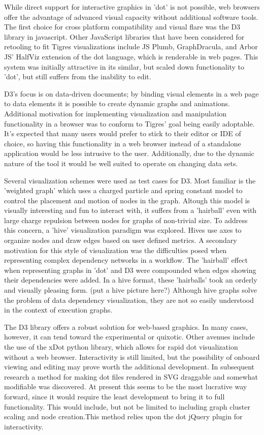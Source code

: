 While direct support for interactive graphics in 'dot' is not possible, web browsers offer the advantage of advanced visual capacity without additional software tools. The first choice for cross platform compatibility and visual flare was the D3\cite{d3} library in javascript. Other JavaScript libraries that have been considered for retooling to fit Tigres visualizations include JS Plumb\cite{jsPlumb}, GraphDracula\cite{graphDracula}, and Arbor JS' HalfViz\cite{halfViz} extension of the dot language, which is renderable in web pages. This system was initially attractive in its similar, but scaled down functionality to 'dot', but still suffers from the inability to edit. 

D3's focus is on data-driven documents; by binding visual elements in a web page to data elements it is possible to create dynamic graphs and animations. Additional motivation for implementing visualization and manipulation functionality in a browser was to conform to Tigres' goal being easily adoptable. It's expected that many users would prefer to stick to their editor or IDE of choice, so having this functionality in a web browser instead of a standalone application would be less intrusive to the user. Additionally, due to the dynamic nature of the tool it would be well suited to operate on changing data sets.

Several visualization schemes were used as test cases for D3. Most familiar is the 'weighted graph' which uses a charged particle and spring constant model to control the placement and motion of nodes in the graph. Altough this model is visually interesting and fun to interact with, it suffers from a 'hairball' even with large charge repulsion between nodes for graphs of non-trivial size. To address this concern, a 'hive' visualization paradigm was explored. Hives use axes to organize nodes and draw edges based on user defined metrics. A secondary motivation for this style of visualization was the difficulties posed when representing complex dependency networks in a workflow. The 'hairball' effect when representing graphs in 'dot' and D3 were compounded when edges showing their dependencies were added. In a hive format, these 'hairballs' took an orderly and visually pleasing form. (put a hive picture here?)
Although hive graphs solve the problem of data dependency visualization, they are not so easily understood in the context of execution graphs. 


 The D3 library offers a robust solution for web-based graphics. In many cases, however, it can tend toward the experimental or quixotic. Other avenues include the use of the xDot\cite{xDot} python library, which allows for rapid dot visualization without a web browser. Interactivity is still limited, but the possibility of onboard viewing and editing may prove worth the additional development. In subsequent research a method for making dot files rendered in SVG draggable and somewhat modifiable was discovered. At present this seems to be the most lucrative way forward, since it would require the least development to bring it to full functionality. This would include, but not be limited to including graph cluster scaling and node creation.This method relies upon the dot jQuery plugin \cite{dotJquery} for interactivity. 


\label{sec:viz}
